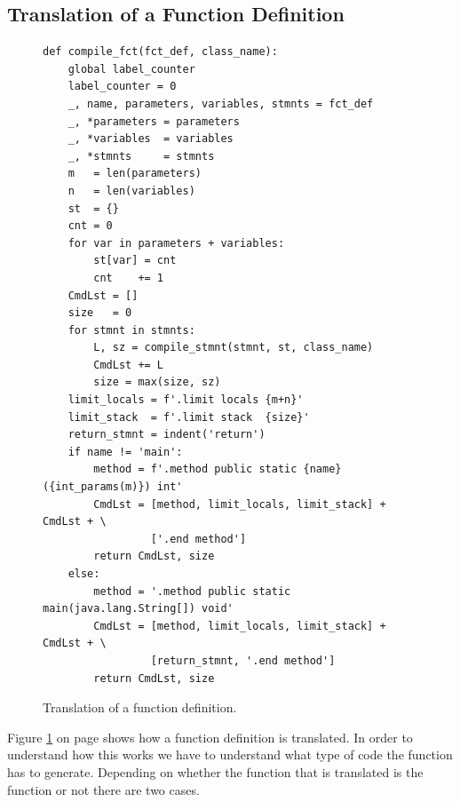 \subsection{Translation of a Function Definition}
\begin{figure}[!ht]
\centering
\begin{verbatim}
def compile_fct(fct_def, class_name):
    global label_counter
    label_counter = 0
    _, name, parameters, variables, stmnts = fct_def
    _, *parameters = parameters
    _, *variables  = variables
    _, *stmnts     = stmnts
    m   = len(parameters)
    n   = len(variables)
    st  = {}
    cnt = 0
    for var in parameters + variables:
        st[var] = cnt
        cnt    += 1
    CmdLst = []
    size   = 0
    for stmnt in stmnts:
        L, sz = compile_stmnt(stmnt, st, class_name)
        CmdLst += L
        size = max(size, sz)
    limit_locals = f'.limit locals {m+n}'
    limit_stack  = f'.limit stack  {size}'
    return_stmnt = indent('return')
    if name != 'main':
        method = f'.method public static {name}({int_params(m)}) int'
        CmdLst = [method, limit_locals, limit_stack] + CmdLst + \
                 ['.end method']
        return CmdLst, size
    else:
        method = '.method public static main(java.lang.String[]) void'
        CmdLst = [method, limit_locals, limit_stack] + CmdLst + \
                 [return_stmnt, '.end method']
        return CmdLst, size
\end{verbatim}
\vspace*{-0.3cm}
\caption{Translation of a function definition.}
\label{fig:Compiler.ipynb:compile:fct}
\end{figure}
\noindent
Figure \ref{fig:Compiler.ipynb:compile:fct} on page \pageref{fig:Compiler.ipynb:compile:fct} shows how a
function definition is translated.  
In order to understand how this works we have to understand what type of code the function  has
to generate.  Depending on whether the function that is translated is the function  or not there
are two cases.
